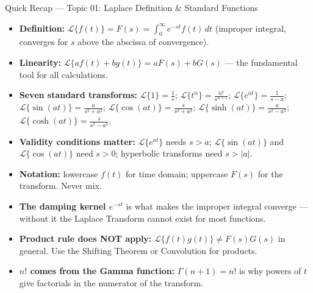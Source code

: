 \documentclass[12pt,a4paper]{article}
\begin{document}
\begin{learnbox}{Quick Recap --- Topic 01: Laplace Definition \& Standard Functions}
\begin{itemize}[leftmargin=1.5em]
  \item \textbf{Definition:} $\mathcal{L}\{f(t)\} = F(s) = \int_0^{\infty} e^{-st}f(t)\,dt$ (improper integral, converges for $s$ above the abscissa of convergence).
  \item \textbf{Linearity:} $\mathcal{L}\{af(t)+bg(t)\} = aF(s)+bG(s)$ --- the fundamental tool for all calculations.
  \item \textbf{Seven standard transforms:} $\mathcal{L}\{1\}=\frac{1}{s}$; $\mathcal{L}\{t^n\}=\frac{n!}{s^{n+1}}$; $\mathcal{L}\{e^{at}\}=\frac{1}{s-a}$; $\mathcal{L}\{\sin(at)\}=\frac{a}{s^2+a^2}$; $\mathcal{L}\{\cos(at)\}=\frac{s}{s^2+a^2}$; $\mathcal{L}\{\sinh(at)\}=\frac{a}{s^2-a^2}$; $\mathcal{L}\{\cosh(at)\}=\frac{s}{s^2-a^2}$.
  \item \textbf{Validity conditions matter:} $\mathcal{L}\{e^{at}\}$ needs $s > a$; $\mathcal{L}\{\sin(at)\}$ and $\mathcal{L}\{\cos(at)\}$ need $s > 0$; hyperbolic transforms need $s > |a|$.
  \item \textbf{Notation:} lowercase $f(t)$ for time domain; uppercase $F(s)$ for the transform. Never mix.
  \item \textbf{The damping kernel $e^{-st}$} is what makes the improper integral converge --- without it the Laplace Transform cannot exist for most functions.
  \item \textbf{Product rule does NOT apply:} $\mathcal{L}\{f(t)g(t)\} \neq F(s)G(s)$ in general. Use the Shifting Theorem or Convolution for products.
  \item \textbf{$n!$ comes from the Gamma function:} $\Gamma(n+1) = n!$ is why powers of $t$ give factorials in the numerator of the transform.
\end{itemize}
\end{learnbox}
\end{document}
